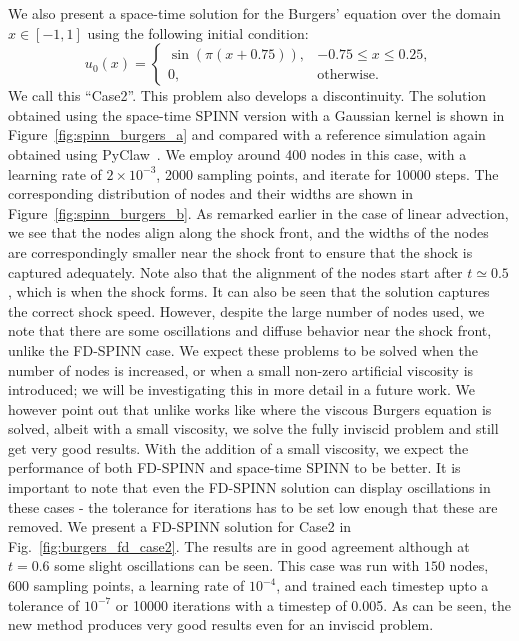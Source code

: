 \documentclass[12pt]{article}
\newcommand{\rr}[1]{#1}
\newcommand{\rb}[1]{#1}
\begin{document}
We also present a space-time solution for the Burgers' equation over the domain $x \in [-1, 1]$ using the following initial condition:
\begin{displaymath}
u_0(x) = \begin{cases}
\sin(\pi(x + 0.75)), & -0.75 \le x \le 0.25,\\
0, & \text{otherwise}.
\end{cases}
\end{displaymath}
\rb{We call this ``Case2''.} This problem also develops a discontinuity. The solution obtained using the space-time SPINN version with a Gaussian kernel is shown in Figure~\ref{fig:spinn_burgers_a} and compared with a reference simulation again obtained using PyClaw~\cite{pyclaw}. \rb{We employ around 400 nodes in this case, with a learning rate of $2\times 10^{-3}$, 2000 sampling points, and iterate for 10000 steps.} The corresponding distribution of nodes and their widths are shown in Figure~\ref{fig:spinn_burgers_b}. As remarked earlier in the case of linear advection, we see that the nodes align along the shock front, and the widths of the nodes are correspondingly smaller near the shock front to ensure that the shock is captured adequately. Note also that the alignment of the nodes start after $t \simeq 0.5$, which is when the shock forms. It can also be seen that the solution captures the correct shock speed. However, despite the large number of nodes used, we note that there are some oscillations and diffuse behavior near the shock front, unlike the FD-SPINN case. We expect these problems to be solved when the number of nodes is increased, or when a small non-zero artificial viscosity is introduced; we will be investigating this in more detail in a future work. \rr{We however point out that unlike works like \cite{RPK2019} where the viscous Burgers equation is solved, albeit with a small viscosity, we solve the fully inviscid problem and still get very good results. With the addition of a small viscosity, we expect the performance of both FD-SPINN and space-time SPINN to be better.} \rb{It is important to note that even the FD-SPINN solution can display oscillations in these cases - the tolerance for iterations has to be set low enough that these are removed.  We present a FD-SPINN solution for Case2 in Fig.~\ref{fig:burgers_fd_case2}.  The results are in good agreement although at $t=0.6$ some slight oscillations can be seen.  This case was run with $150$ nodes, $600$ sampling points, a learning rate of $10^{-4}$, and trained each timestep upto a tolerance of $10^{-7}$ or 10000 iterations with a timestep of 0.005.  As can be seen, the new method produces very good results even for an inviscid problem.}
\end{document}
